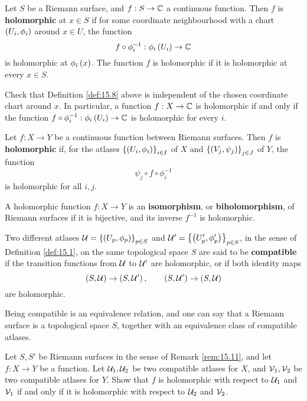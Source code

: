 \begin{definition}
\label{def:15.8}
Let $ S $ be a Riemann surface, and $ f : S \to \mathbb{C} $ a continuous function. Then $ f $ is \textbf{holomorphic} at $ x \in S $ if for some coordinate neighbourhood with a chart $ \left( U_i, \phi_i \right) $ around $ x \in U $, the function
$$ f \circ \phi_i^{-1} : \phi_i\left( U_i \right) \to \mathbb{C} $$
is holomorphic at $ \phi_i\left( x \right) $. The function $ f $ is holomorphic if it is holomorphic at every $ x \in S $.
\end{definition}

\begin{exercise}
Check that Definition \ref{def:15.8} above is independent of the chosen coordinate chart around $ x $. In particular, a function $ f : X \to \mathbb{C} $ is holomorphic if and only if the function $ f \circ \phi_i^{-1} : \phi_i\left( U_i \right) \to \mathbb{C} $ is holomorphic for every $ i $.
\end{exercise}

\begin{definition}
Let $ f : X \to Y $ be a continuous function between Riemann surfaces. Then $ f $ is \textbf{holomorphic} if, for the atlases $ \left\{ \left( U_i, \phi_i \right) \right\}_{i \in I} $ of $ X $ and $ \left\{ \left( V_j, \psi_j \right) \right\}_{j \in J} $ of $ Y $, the function
$$ \psi_j \circ f \circ \phi_i^{-1} $$
is holomorphic for all $ i, j $.
\end{definition}

\begin{definition}
A holomorphic function $ f : X \to Y $ is an \textbf{isomorphism}, or \textbf{biholomorphism}, of Riemann surfaces if it is bijective, and its inverse $ f^{-1} $ is holomorphic.
\end{definition}

\begin{remark}
\label{rem:15.11}
Two different atlases $ \mathcal{U} = \left\{ \left( U_p, \phi_p \right) \right\}_{p \in S} $ and $ \mathcal{U}' = \left\{ \left( U'_p, \phi'_p \right) \right\}_{p \in S} $, in the sense of Definition \ref{def:15.1}, on the same topological space $ S $ are said to be \textbf{compatible} if the transition functions from $ \mathcal{U} $ to $ \mathcal{U}' $ are holomorphic, or if both identity maps
$$ \left( S, \mathcal{U} \right) \to \left( S, \mathcal{U}' \right), \qquad \left( S, \mathcal{U}' \right) \to \left( S, \mathcal{U} \right) $$
are holomorphic.
\end{remark}

Being compatible is an equivalence relation, and one can say that a Riemann surface is a topological space $ S $, together with an equivalence class of compatible atlases.

\begin{exercise}
Let $ S, S' $ be Riemann surfaces in the sense of Remark \ref{rem:15.11}, and let $ f : X \to Y $ be a function. Let $ \mathcal{U}_1, \mathcal{U}_2 $ be two compatible atlases for $ X $, and $ \mathcal{V}_1, \mathcal{V}_2 $ be two compatible atlases for $ Y $. Show that $ f $ is holomorphic with respect to $ \mathcal{U}_1 $ and $ \mathcal{V}_1 $ if and only if it is holomorphic with respect to $ \mathcal{U}_2 $ and $ \mathcal{V}_2 $.
\end{exercise}

